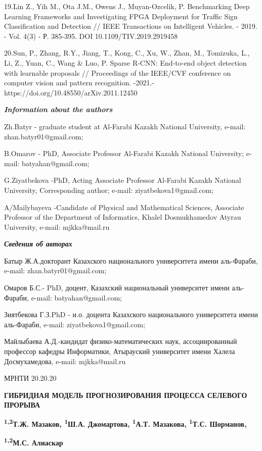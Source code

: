19.Lin Z., Yih M., Ota J.M., Owens J., Muyan-Ozcelik, P. Benchmarking
Deep Learning Frameworks and Investigating FPGA Deployment for Traffic
Sign Classification and Detection // IEEE Transactions on Intelligent
Vehicles. - 2019. - Vol. 4(3) - Р. 385-395. DOI 10.1109/TIV.2019.2919458

20.Sun, P., Zhang, R.Y., Jiang, T., Kong, C., Xu, W., Zhan, M.,
Tomizuka, L., Li, Z., Yuan, C., Wang \& Luo, P. Sparse R-CNN: End-to-end
object detection with learnable proposals // Proceedings of the IEEE/CVF
conference on computer vision and pattern recognition. -2021.-
https://doi.org/10.48550/arXiv.2011.12450

\emph{\textbf{Information about the authors}}

Zh.Batyr - graduate student at Al-Farabi Kazakh National University,
e-mail: zhan.batyr01@gmail.com;

B.Omarov - PhD, Associate Professor Al-Farabi Kazakh National
University; e-mail: batyahan@gmail.com;

G.Ziyatbekova -PhD, Acting Associate Professor Al-Farabi Kazakh National
University, Corresponding author; e-mail: ziyatbekova1@gmail.com;

A/Mailybayeva -Candidate of Physical and Mathematical Sciences,
Associate Professor of the Department of Informatics, Khalel
Dosmukhamedov Atyrau University, e-mail: mjkka@mail.ru

\emph{\textbf{Сведения об авторах}}

Батыр Ж.А.докторант Казахского национального университета имени
аль-Фараби, e-mail: zhan.batyr01@gmail.com;

Омаров Б.С.- PhD, доцент, Казахский национальный университет имени
аль-Фараби, e-mail: batyahan@gmail.com;

Зиятбекова Г.З.PhD - и.о. доцента Казахского национального университета
имени аль-Фараби, e-mail: ziyatbekova1@gmail.com;

Майлыбаева А.Д.-кандидат физико-математических наук, ассоциированный
профессор кафедры Информатики, Атырауский университет имени Халела
Досмухамедова, e-mail: mjkka@mail.ru

МРНТИ 20.20.20

\textbf{ГИБРИДНАЯ МОДЕЛЬ ПРОГНОЗИРОВАНИЯ ПРОЦЕССА СЕЛЕВОГО ПРОРЫВА}

\textbf{\textsuperscript{1,2}Т.Ж. Мазаков, \textsuperscript{1}Ш.А.
Джомартова, \textsuperscript{1}А.Т. Мазакова, \textsuperscript{1}Т.С.
Шорманов,}

\textbf{\textsuperscript{1,2}М.С. Алиаскар}

